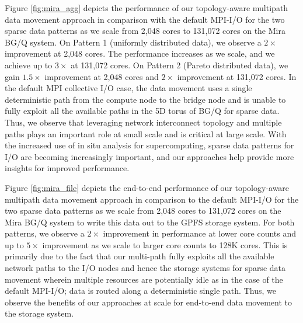 \documentclass[final,5p,times]{elsarticle}
\begin{document}
Figure \ref{fig:mira_agg} depicts the performance of our topology-aware multipath data movement approach in comparison with the default MPI-I/O for the two sparse data patterns as we scale from 2,048 cores to 131,072 cores on the Mira BG/Q system. On Pattern 1 (uniformly distributed data), we observe a $2\times$ improvement at 2,048 cores. The performance increases as we scale, and we achieve up to $3\times$ at 131,072 cores. On Pattern 2 (Pareto distributed data), we gain $1.5\times$ improvement at 2,048 cores and $2\times$ improvement at 131,072 cores. In the default MPI collective I/O case, the data movement uses a single deterministic path from the compute node to the bridge node and is unable to fully exploit all the available paths in the 5D torus of BG/Q for sparse data. Thus, we observe that leveraging network interconnect topology and multiple paths plays an important role at small scale and is critical at large scale. With the increased use of in situ analysis for supercomputing,  sparse data patterns for I/O are becoming increasingly important, and our approaches help provide more insights for improved performance.

Figure \ref{fig:mira_file} depicts the end-to-end performance of our topology-aware multipath data movement approach in comparison to the default MPI-I/O for the two sparse data patterns as we scale from 2,048 cores to 131,072 cores on the Mira BG/Q system to write this data out to the GPFS storage system. For both patterns, we observe a $2\times$ improvement in performance at lower core counts and up to $5\times$ improvement as we scale to larger core counts to 128K cores. This is primarily due to the fact that our  multi-path fully exploits all the available network paths to the I/O nodes and hence the storage systems for sparse data movement wherein multiple resources are potentially idle as in the case of the default MPI-I/O; data is routed along a deterministic single path. Thus, we observe the benefits of our approaches at scale for end-to-end data movement to the storage system.
\end{document}
